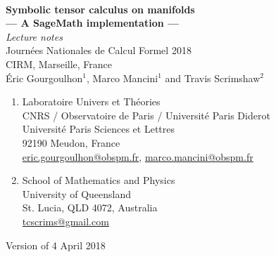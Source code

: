 \documentclass[12pt,a4paper]{book}
\begin{document}

\begin{titlepage}
\
\vspace{4cm}
\begin{center}
{\Huge\textbf{Symbolic tensor calculus on manifolds}}\\[2ex]
{\LARGE\textbf{--- A SageMath implementation ---}}\\[3ex]
{\LARGE\emph{Lecture notes}}\\[1ex]
{\Large Journées Nationales de Calcul Formel 2018\\[1ex]
CIRM, Marseille, France}\\[8ex]
{\large Éric Gourgoulhon$^1$, Marco Mancini$^1$ and Travis Scrimshaw$^2$}
\end{center}
\begin{enumerate}
\item Laboratoire Univers et Théories \\
CNRS / Observatoire de Paris / Université Paris Diderot\\
Université Paris Sciences et Lettres \\
92190 Meudon, France \\
\href{mailto:eric.gourgoulhon@obspm.fr}{eric.gourgoulhon@obspm.fr},
\href{mailto:marco.mancini@obspm.fr}{marco.mancini@obspm.fr}
\item School of Mathematics and Physics\\
University of Queensland \\
St. Lucia, QLD 4072, Australia \\
\href{mailto:tcscrims@gmail.com}{tcscrims@gmail.com}
\end{enumerate}
\begin{center}
Version of 4 April 2018
\end{center}
\end{titlepage}

\dominitoc

\newpage


\tableofcontents












\end{document}
